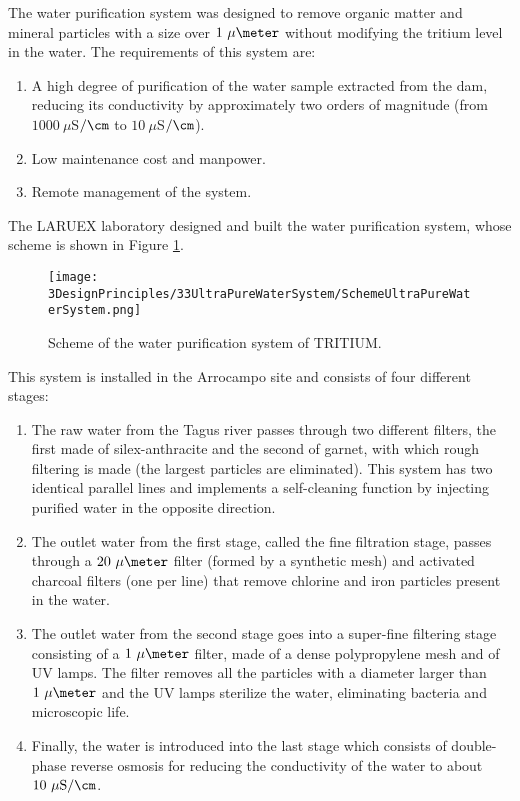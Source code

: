 The water purification system was designed to remove organic matter and mineral particles with a size over $1~\mu\meter$ without modifying the tritium level in the water. The requirements of this system are:

\begin{enumerate}

\item{} A high degree of purification of the water sample extracted from the dam, reducing its conductivity by approximately two orders of magnitude (from $1000~\mu$S$/\cm$ to $10~\mu$S$/\cm$).

\item{} Low maintenance cost  and manpower.

\item{} Remote management of the system.
\end{enumerate}

The LARUEX laboratory designed and built the water purification system, whose scheme is shown in Figure \ref{fig:WPSScheme}.
\begin{figure}[htbp]
\centering
\texttt{[image: 3DesignPrinciples/33UltraPureWaterSystem/SchemeUltraPureWaterSystem.png]}
\caption{Scheme of the water purification system of TRITIUM.\label{fig:WPSScheme}}
\end{figure}
This system is installed in the Arrocampo site and consists of four different stages:

\begin{enumerate}
\item{} The raw water from the Tagus river passes through two different filters, the first made of silex-anthracite and the second of garnet, with which rough filtering is made (the largest particles are eliminated). This system has two identical parallel lines and implements a self-cleaning function by injecting purified water in the opposite direction.

\item{} The outlet water from the first stage, called the fine filtration stage, passes through a $20~\mu\meter$ filter (formed by a synthetic mesh) and activated charcoal filters (one per line) that remove chlorine and iron particles present in the water.

\item{} The outlet water from the second stage goes into a super-fine filtering stage consisting of a $1~\mu\meter$ filter, made of a dense polypropylene mesh and of UV lamps. The filter removes all the particles with a diameter larger than $1~\mu\meter$ and the UV lamps sterilize the water, eliminating bacteria and microscopic life.

\item{} Finally, the water is introduced into the last stage which consists of double-phase reverse osmosis for reducing the conductivity of the water to about $10~\mu\mathrm{S}/\cm$. 

\end{enumerate}

